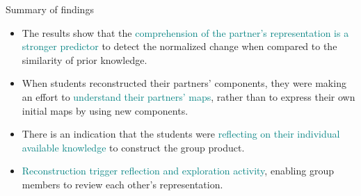 \begin{frame}{Summary of findings}
\begin{block}
    
\begin{itemize}
    \item <1> The results show that the \textcolor{teal}{comprehension of the partner's representation is a stronger predictor} to detect the normalized change when compared to the similarity of prior knowledge.
    \item <2> When students reconstructed their partners' components, they were making an effort to \textcolor{teal}{understand their partners' maps}, rather than to express their own initial maps by using new components. 
    \item <3-> There is an indication that the students were \textcolor{teal}{reflecting on their individual available knowledge} to construct the group product. 
    \item <4> \textcolor{teal}{Reconstruction trigger reflection and exploration activity}, enabling group members to review each other's representation.
\end{itemize}

\end{block}
\end{frame}




